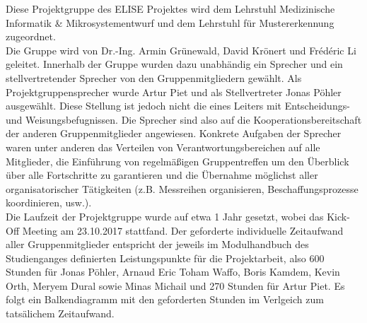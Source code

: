 

Diese Projektgruppe des ELISE Projektes wird dem Lehrstuhl Medizinische Informatik \& Mikrosystementwurf und dem Lehrstuhl für Mustererkennung zugeordnet. \\

Die Gruppe wird von Dr.-Ing. Armin Grünewald, David Krönert und Frédéric Li geleitet. 
Innerhalb der Gruppe wurden dazu unabhändig ein Sprecher und ein stellvertretender Sprecher von den Gruppenmitgliedern gewählt. Als Projektgruppensprecher wurde Artur Piet und als Stellvertreter Jonas Pöhler ausgewählt. 
Diese Stellung ist jedoch nicht die eines Leiters mit Entscheidungs- und Weisungsbefugnissen. Die Sprecher sind also auf die Kooperationsbereitschaft der anderen Gruppenmitglieder angewiesen. 
Konkrete Aufgaben der Sprecher waren unter anderen das Verteilen von Verantwortungsbereichen auf alle Mitglieder, die Einführung von regelmäßigen Gruppentreffen um den Überblick über alle Fortschritte zu garantieren und die Übernahme möglichst aller organisatorischer Tätigkeiten (z.B. Messreihen organisieren, Beschaffungsprozesse koordinieren, usw.). \\

Die Laufzeit der Projektgruppe wurde auf etwa 1 Jahr gesetzt, wobei das Kick-Off Meeting am 23.10.2017 stattfand. Der geforderte individuelle Zeitaufwand aller Gruppenmitglieder entspricht der jeweils im Modulhandbuch des Studienganges definierten Leistungspunkte für die Projektarbeit, also 600 Stunden für Jonas Pöhler, Arnaud Eric Toham Waffo, Boris Kamdem, Kevin Orth, Meryem Dural sowie Minas Michail und 270 Stunden für Artur Piet. Es folgt ein Balkendiagramm mit den geforderten Stunden im Verlgeich zum tatsälichem Zeitaufwand. \\

